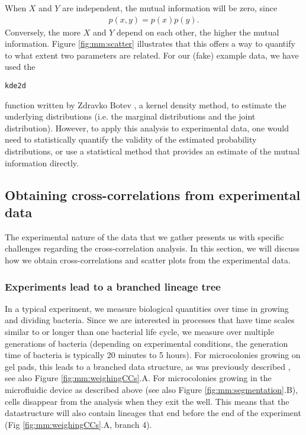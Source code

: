 {%
%
When $X$ and $Y$ are independent, the mutual information will be zero, since 
\begin{align*}
	p(x,y)=p(x)p(y)
	.
\end{align*}
%
Conversely, the more $X$ and $Y$ depend on each other, the higher the mutual information.
Figure \ref{fig:mm:scatter} illustrates that this offers a way to quantify to what extent two parameters are related.
%
For our (fake) example data, we have used the 
\begin{verbatim}
kde2d
\end{verbatim}
function written by Zdravko Botev \cite{Botev2010}, a kernel density method, 
to estimate the underlying distributions (i.e. the marginal distributions and the joint distribution).
However, to apply this analysis to experimental data, one would need to statistically quantify the validity of the estimated probability distributions, 
or use a statistical method
that provides an estimate of the mutual information directly.


\subsection{Obtaining cross-correlations from experimental data}
\label{sec:methods:CCs}

The experimental nature of the data that we gather presents us with specific challenges regarding the cross-correlation analysis.
%
In this section, we will discuss how we obtain cross-correlations and scatter plots from the experimental data.

\subsubsection{Experiments lead to a branched lineage tree}
In a typical experiment, we measure biological quantities over time in growing and dividing bacteria. 
%
Since we are interested in processes that have time scales similar to or longer than one bacterial life cycle, we measure over multiple generations of bacteria (depending on experimental conditions, the generation time of bacteria is typically 20 minutes to 5 hours).
%
For microcolonies growing on gel pads, this leads to a branched data structure, as was previously described \cite{Kiviet2010,Walker2016t}, see also Figure \ref{fig:mm:weighingCCs}.A. 
% 
For microcolonies growing in the microfluidic device as described above (see also Figure \ref{fig:mm:segmentation}.B), cells disappear from the analysis when they exit the well. This means that the datastructure will also contain lineages that end before the end of the experiment (Fig \ref{fig:mm:weighingCCs}.A, branch 4).
%

}
